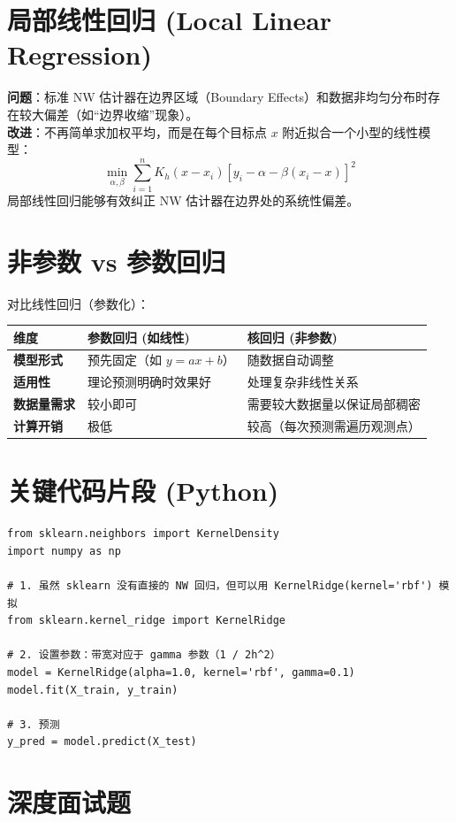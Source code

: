 \documentclass[12pt, a4paper]{article}
\begin{document}
\section{局部线性回归 (Local Linear Regression)}
\textbf{问题}：标准 NW 估计器在边界区域（Boundary Effects）和数据非均匀分布时存在较大偏差（如“边界收缩”现象）。
\\ \textbf{改进}：不再简单求加权平均，而是在每个目标点 $x$ 附近拟合一个小型的线性模型：
$$ \min_{\alpha, \beta} \sum_{i=1}^n K_h(x - x_i) [y_i - \alpha - \beta(x_i - x)]^2 $$
局部线性回归能够有效纠正 NW 估计器在边界处的系统性偏差。

\section{非参数 vs 参数回归}
对比线性回归（参数化）：
\begin{table}[h]
\centering
\begin{tabularx}{\textwidth}{|l|X|X|}
\hline
\textbf{维度} & \textbf{参数回归 (如线性)} & \textbf{核回归 (非参数)} \\
\hline
\textbf{模型形式} & 预先固定（如 $y=ax+b$） & 随数据自动调整 \\
\hline
\textbf{适用性} & 理论预测明确时效果好 & 处理复杂非线性关系 \\
\hline
\textbf{数据量需求} & 较小即可 & 需要较大数据量以保证局部稠密 \\
\hline
\textbf{计算开销} & 极低 & 较高（每次预测需遍历观测点） \\
\hline
\end{tabularx}
\end{table}

\section{关键代码片段 (Python)}
\begin{lstlisting}
from sklearn.neighbors import KernelDensity
import numpy as np

# 1. 虽然 sklearn 没有直接的 NW 回归，但可以用 KernelRidge(kernel='rbf') 模拟
from sklearn.kernel_ridge import KernelRidge

# 2. 设置参数：带宽对应于 gamma 参数（1 / 2h^2）
model = KernelRidge(alpha=1.0, kernel='rbf', gamma=0.1)
model.fit(X_train, y_train)

# 3. 预测
y_pred = model.predict(X_test)
\end{lstlisting}

\section{深度面试题}
\end{document}
